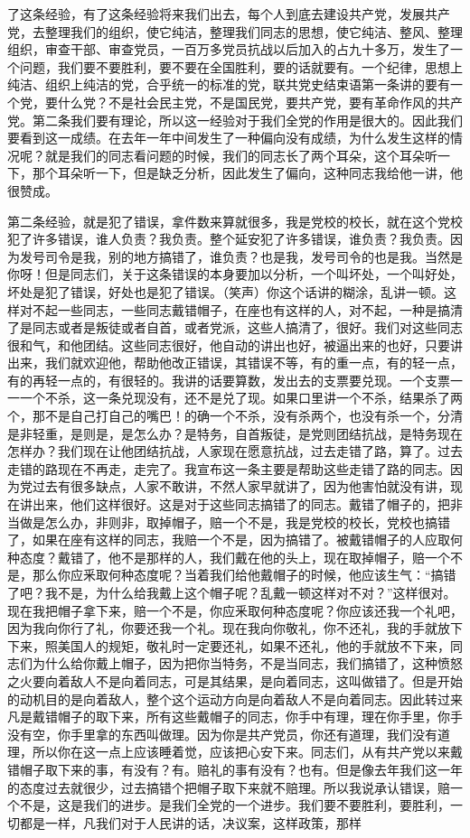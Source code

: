了这条经验，有了这条经验将来我们出去，每个人到底去建设共产党，发展共产党，去整理我们的组织，使它纯洁，整理我们同志的思想，使它纯洁、整风、整理组织，审查干部、审查党员，一百万多党员抗战以后加入的占九十多万，发生了一个问题，我们要不要胜利，要不要在全国胜利，要的话就要有。一个纪律，思想上纯洁、组织上纯洁的党，合乎统一的标准的党，联共党史结束语第一条讲的要有一个党，要什么党？不是社会民主党，不是国民党，要共产党，要有革命作风的共产党。第二条我们要有理论，所以这一经验对于我们全党的作用是很大的。因此我们要看到这一成绩。在去年一年中间发生了一种偏向没有成绩，为什么发生这样的情况呢？就是我们的同志看问题的时候，我们的同志长了两个耳朵，这个耳朵听一下，那个耳朵听一下，但是缺乏分析，因此发生了偏向，这种同志我给他一讲，他很赞成。

第二条经验，就是犯了错误，拿件数来算就很多，我是党校的校长，就在这个党校犯了许多错误，谁人负责？我负责。整个延安犯了许多错误，谁负责？我负责。因为发号司令是我，别的地方搞错了，谁负责？也是我，发号司令的也是我。当然是你呀！但是同志们，关于这条错误的本身要加以分析，一个叫坏处，一个叫好处，坏处是犯了错误，好处也是犯了错误。（笑声）你这个话讲的糊涂，乱讲一顿。这样对不起一些同志，一些同志戴错帽子，在座也有这样的人，对不起，一种是搞清了是同志或者是叛徒或者自首，或者党派，这些人搞清了，很好。我们对这些同志很和气，和他团结。这些同志很好，他自动的讲出也好，被逼出来的也好，只要讲出来，我们就欢迎他，帮助他改正错误，其错误不等，有的重一点，有的轻一点，有的再轻一点的，有很轻的。我讲的话要算数，发出去的支票要兑现。一个支票一一一个不杀，这一条兑现没有，还不是兑了现。如果口里讲一个不杀，结果杀了两个，那不是自己打自己的嘴巴！的确一个不杀，没有杀两个，也没有杀一个，分清是非轻重，是则是，是怎么办？是特务，自首叛徒，是党则团结抗战，是特务现在怎样办？我们现在让他团结抗战，人家现在愿意抗战，过去走错了路，算了。过去走错的路现在不再走，走完了。我宣布这一条主要是帮助这些走错了路的同志。因为党过去有很多缺点，人家不敢讲，不然人家早就讲了，因为他害怕就没有讲，现在讲出来，他们这样很好。这是对于这些同志搞错了的同志。戴错了帽子的，把非当做是怎么办，非则非，取掉帽子，赔一个不是，我是党校的校长，党校也搞错了，如果在座有这样的同志，我赔一个不是，因为搞错了。被戴错帽子的人应取何种态度？戴错了，他不是那样的人，我们戴在他的头上，现在取掉帽子，赔一个不是，那么你应釆取何种态度呢？当着我们给他戴帽子的时候，他应该生气：“搞错了吧？我不是，为什么给我戴上这个帽子呢？乱戴一顿这样对不对？”这样很对。现在我把帽子拿下来，赔一个不是，你应釆取何种态度呢？你应该还我一个礼吧，因为我向你行了礼，你要还我一个礼。现在我向你敬礼，你不还礼，我的手就放下下来，照美国人的规矩，敬礼时一定要还礼，如果不还礼，他的手就放不下来，同志们为什么给你戴上帽子，因为把你当特务，不是当同志，我们搞错了，这种愤怒之火要向着敌人不是向着同志，可是其结果，是向着同志，这叫做错了。但是开始的动机目的是向着敌人，整个这个运动方向是向着敌人不是向着同志。因此转过来凡是戴错帽子的取下来，所有这些戴帽子的同志，你手中有理，理在你手里，你手没有空，你手里拿的东西叫做理。因为你是共产党员，你还有道理，我们没有道理，所以你在这一点上应该睡着觉，应该把心安下来。同志们，从有共产党以来戴错帽子取下来的事，有没有？有。赔礼的事有没有？也有。但是像去年我们这一年的态度过去就很少，过去搞错个把帽子取下来就不赔理。所以我说承认错误，赔一个不是，这是我们的进步。是我们全党的一个进步。我们要不要胜利，要胜利，一切都是一样，凡我们对于人民讲的话，决议案，这样政策，那样